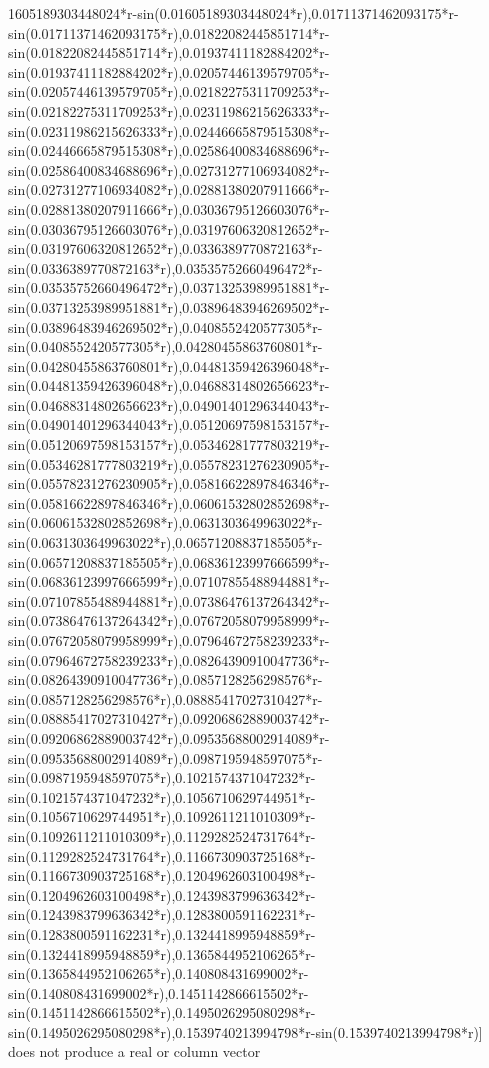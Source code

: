 \documentclass[a4paper,10pt]{article}
\begin{document}
\begin{eulernotebook}
\begin{eulercomment}
\begin{eulercomment}
\begin{eulercomment}
\begin{eulercomment}
\begin{eulercomment}
\begin{eulercomment}
\begin{eulercomment}
\begin{eulercomment}
\begin{euleroutput}
1605189303448024*r-sin(0.01605189303448024*r),0.01711371462093175*r-sin(0.01711371462093175*r),0.01822082445851714*r-sin(0.01822082445851714*r),0.01937411182884202*r-sin(0.01937411182884202*r),0.02057446139579705*r-sin(0.02057446139579705*r),0.02182275311709253*r-sin(0.02182275311709253*r),0.02311986215626333*r-sin(0.02311986215626333*r),0.02446665879515308*r-sin(0.02446665879515308*r),0.02586400834688696*r-sin(0.02586400834688696*r),0.02731277106934082*r-sin(0.02731277106934082*r),0.02881380207911666*r-sin(0.02881380207911666*r),0.03036795126603076*r-sin(0.03036795126603076*r),0.03197606320812652*r-sin(0.03197606320812652*r),0.0336389770872163*r-sin(0.0336389770872163*r),0.03535752660496472*r-sin(0.03535752660496472*r),0.03713253989951881*r-sin(0.03713253989951881*r),0.03896483946269502*r-sin(0.03896483946269502*r),0.0408552420577305*r-sin(0.0408552420577305*r),0.04280455863760801*r-sin(0.04280455863760801*r),0.04481359426396048*r-sin(0.04481359426396048*r),0.04688314802656623*r-sin(0.04688314802656623*r),0.04901401296344043*r-sin(0.04901401296344043*r),0.05120697598153157*r-sin(0.05120697598153157*r),0.05346281777803219*r-sin(0.05346281777803219*r),0.05578231276230905*r-sin(0.05578231276230905*r),0.05816622897846346*r-sin(0.05816622897846346*r),0.06061532802852698*r-sin(0.06061532802852698*r),0.0631303649963022*r-sin(0.0631303649963022*r),0.06571208837185505*r-sin(0.06571208837185505*r),0.06836123997666599*r-sin(0.06836123997666599*r),0.07107855488944881*r-sin(0.07107855488944881*r),0.07386476137264342*r-sin(0.07386476137264342*r),0.07672058079958999*r-sin(0.07672058079958999*r),0.07964672758239233*r-sin(0.07964672758239233*r),0.08264390910047736*r-sin(0.08264390910047736*r),0.0857128256298576*r-sin(0.0857128256298576*r),0.08885417027310427*r-sin(0.08885417027310427*r),0.09206862889003742*r-sin(0.09206862889003742*r),0.09535688002914089*r-sin(0.09535688002914089*r),0.0987195948597075*r-sin(0.0987195948597075*r),0.1021574371047232*r-sin(0.1021574371047232*r),0.1056710629744951*r-sin(0.1056710629744951*r),0.1092611211010309*r-sin(0.1092611211010309*r),0.1129282524731764*r-sin(0.1129282524731764*r),0.1166730903725168*r-sin(0.1166730903725168*r),0.1204962603100498*r-sin(0.1204962603100498*r),0.1243983799636342*r-sin(0.1243983799636342*r),0.1283800591162231*r-sin(0.1283800591162231*r),0.1324418995948859*r-sin(0.1324418995948859*r),0.1365844952106265*r-sin(0.1365844952106265*r),0.140808431699002*r-sin(0.140808431699002*r),0.1451142866615502*r-sin(0.1451142866615502*r),0.1495026295080298*r-sin(0.1495026295080298*r),0.1539740213994798*r-sin(0.1539740213994798*r)] does not produce a real or column vector
  

\end{euleroutput}
\end{eulercomment}
\end{eulercomment}
\end{eulercomment}
\end{eulercomment}
\end{eulercomment}
\end{eulercomment}
\end{eulercomment}
\end{eulercomment}
\end{eulernotebook}
\end{document}
